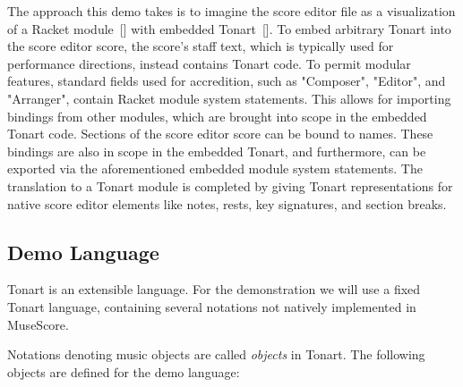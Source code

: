\documentclass[10pt, sigplan]{acmart}
\let\Footnote\undefined
\newcommand{\textsuper}[1]{$^{\hbox{\textsmaller{#1}}}$}
\let\SOriginalthesubsubsection\thesubsubsection
\newcommand{\Ssubsection}[2]{\subsection[#1]{#2}\let\thesubsubsection\SOriginalthesubsubsection}
\newcommand{\AutobibLink}[1]{\color{ACMPurple}{#1}}
\newcommand{\Autobibref}[1]{#1}
\providecommand{\AutobibLink}[1]{#1}
\newcommand{\Footnote}[1]{\footnote{#1}}
\newcommand{\FootnoteRef}[1]{}
\newcommand{\FootnoteContent}[1]{#1}
\begin{document}
The approach this demo takes is to imagine the score editor file as a
visualization of a Racket module\Autobibref{~[\hyperref[t:x28autobib_x22Flattx2c_MatthewComposable_and_Compilable_Macrosx3a_You_Want_it_Whenx3fIn_Procx2e_ACM_Intlx2e_Confx2e_Functional_Programmingx2c_ppx2e_72x2dx2d832002x22x29]{\AutobibLink{4}}]} with embedded
Tonart\Autobibref{~[\hyperref[t:x28autobib_x22Gentnerx2c_JaredDemox3a_Composable_Compositions_with_TonartIn_Procx2e_12th_ACM_SIGPLAN_International_Workshop_on_Functional_Artx2c_Musicx2c_Modellingx2c_and_Designx2c_ppx2e_42x2dx2d442024httpsx3ax2fx2fdoix2eorgx2f10x2e1145x2f3677996x2e3678294x22x29]{\AutobibLink{2}}]}.  To embed arbitrary Tonart into the score editor
score, the score{'}s staff text, which is typically used for performance
directions, instead contains Tonart code.  To permit modular features, standard
fields used for accredition, such as "Composer", "Editor", and "Arranger",
contain Racket module system statements.  This allows for importing bindings
from other modules, which are brought into scope in the embedded Tonart code.
Sections of the score editor score can be bound to names.  These bindings are
also in scope in the embedded Tonart, and furthermore, can be exported via the
aforementioned embedded module system statements.  The translation to a Tonart
module is completed by giving Tonart representations for native score editor
elements like notes, rests, key signatures, and section breaks.

\Ssubsection{Demo Language}{Demo Language}\label{t:x28part_x22Demox5fLanguagex22x29}

Tonart is an extensible language.  For the demonstration we will use a fixed
Tonart language, containing several notations not natively implemented in MuseScore\Footnote{\FootnoteRef{\textsuper{\hyperref[t:x28x7ccounterx2dx28x29x7c_x23x28structx3ageneratedx2dtagx29x29]{1}}}\FootnoteContent{https://musescore.org/en}}.

Notations denoting music objects are called \emph{objects} in Tonart.
The following objects are defined for the demo language:

\hspace*{\fill}\\


\noindent 
\end{document}

